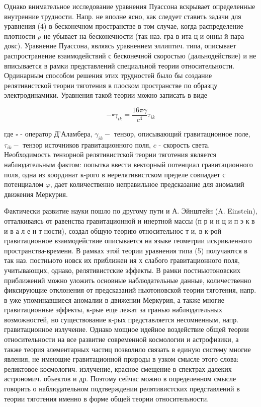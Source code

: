 \documentclass[10pt]{article}
\begin{document}
Однако внимательное исследование уравнения Пуассона вскрывает определенные внутренние трудности. Напр. не вполне ясно, как следует ставить задачи для уравнения (4) в бесконечном пространстве в том случае, когда распределение плотности $\rho$ не убывает на бесконечности (так наз. гра в ита ц и онны й пара докс). Уравнение Пуассона, являясь уравнением эллиптич. типа, описывает распространение взаимодействий с бесконечной скоростью (дальнодействие) и не вписывается в рамки представлений специальной теории относительности. Ординарным способом решения этих трудностей было бы создание релятивистской теории тяготения в плоском пространстве по образцу электродинамики. Уравнения такой теории можно записать в виде



\[

-\square \gamma_{i k}=\frac{16 \pi \gamma}{c^{4}} \tau_{i k}

\]



где $\square$ - оператор Д'Аламбера, $\gamma_{i k}-$ тензор, описывающий гравитационное поле, $\tau_{i k}-$ тензор источников гравитационного поля, $c$ - скорость света. Необходимость тензорной релятивистской теории тяготения является наблюдательным фактом: попытка ввести векторный потенциал гравитационного поля, одна из координат к-рого в нерелятивистском пределе совпадает с потенциалом $\varphi$, дает количественно неправильное предсказание для аномалий движения Меркурия.



Фактически развитие науки пошло по другому пути и А. Эйнштейн (A. Einstein), отталкиваясь от равенства гравитационной и инертной массы (п р и н ц и п э к в и в а л е н т ности), создал общую теорию относительнос т и, в к-рой гравитационное взаимодействие описывается на языке геометрии искривленного пространства-времени. В рамках этой теории уравнения типа (5) получаются в так наз. постньюто новск их приближен ия х слабого гравитационного поля, учитывающих, однако, релятивистские эффекты. В рамки постньютоновских приближений можно уложить основные наблюдательные данные, количественно фиксирующие отклонения от предсказаний ньютоновской теории тяготения, напр. в уже упоминавшиеся аномалии в движении Меркурия, а также многие гравитационные эффекты, к-рые еще лежат за гранью наблюдательных возможностей, но существование к-рых представляется несомненным, напр. гравитационное излучение. Однако мощное идейное воздействие общей теории относительности на все развитие современной космологии и астрофизики, а также теория элементарных частиц позволило связать в единую систему многие явления, не имеющие гравитационной природы в узком смысле этого слова: реликтовое космологич. излучение, красное смещение в спектрах далеких астрономич. объектов и др. Поэтому сейчас можно в определенном смысле говорить о наблюдательном подтверждении релятивистских представлений в теории тяготения именно в форме общей теории относительности.
\end{document}
